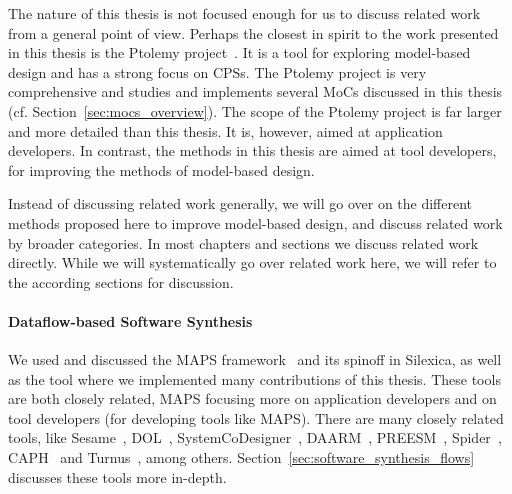 The nature of this thesis is not focused enough for us to discuss related work from a general point of view.
Perhaps the closest in spirit to the work presented in this thesis is the Ptolemy project~\cite{Ptolemaeus:14:SystemDesign}.
It is a tool for exploring model-based design and has a strong focus on \acp{CPS}.
The Ptolemy project is very comprehensive and studies and implements several \acp{MoC} discussed in this thesis (cf. Section~\ref{sec:mocs_overview}).
The scope of the Ptolemy project is far larger and more detailed than this thesis.
It is, however, aimed at application developers.
In contrast, the methods in this thesis are aimed at tool developers, for improving the methods of model-based design.

Instead of discussing related work generally, we will go over on the different methods proposed here to improve model-based design, and discuss related work by broader categories.
In most chapters and sections we discuss related work directly.
While we will systematically go over related work here, we will refer to the according sections for discussion.

\paragraph{Dataflow-based Software Synthesis}
We used and discussed the \ac{MAPS} framework~\cite{maps} and its spinoff in Silexica, as well as the \mocasin tool where we implemented many contributions of this thesis.
These tools are both closely related, \ac{MAPS} focusing more on application developers and \mocasin on tool developers (for developing tools like \ac{MAPS}).
There are many closely related tools, like Sesame~\cite{pimentel2006systematic}, DOL~\cite{thiele2007DOL}, SystemCoDesigner~\cite{haubelt2008systemcodesigner}, DAARM~\cite{weichslgartner2014daarm}, PREESM~\cite{pelcat2014preesm}, Spider~\cite{heulot2014spider}, CAPH~\cite{serot2013caph} and Turnus~\cite{casale2013turnus}, among others.
Section~\ref{sec:software_synthesis_flows} discusses these tools more in-depth.

